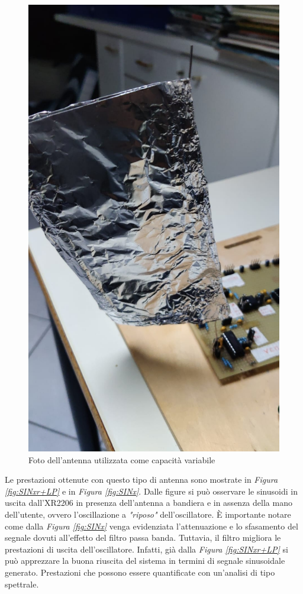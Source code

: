 \documentclass[titlepage]{report}
\begin{document}
	\begin{figure}[H]
		\centering
		\includegraphics[scale=0.25]{Immagini/Antenna.jpg}
		\caption{Foto dell'antenna utilizzata come capacità variabile}
		\label{fig:antenna}
	\end{figure}
	
	Le prestazioni ottenute con questo tipo di antenna sono mostrate in \textit{Figura \ref{fig:SINxr+LP}} e in \textit{Figura \ref{fig:SINx}}. Dalle figure si può osservare le sinusoidi in uscita dall'XR2206 in presenza dell'antenna a bandiera e in assenza della mano dell'utente, ovvero l'oscillazione a \textit{"riposo"} dell'oscillatore. È importante notare come dalla \textit{Figura \ref{fig:SINx}} venga evidenziata l'attenuazione e lo sfasamento del segnale dovuti all'effetto del filtro passa banda. Tuttavia, il filtro migliora le prestazioni di uscita dell'oscillatore. Infatti, già dalla \textit{Figura \ref{fig:SINxr+LP}} si può apprezzare la buona riuscita del sistema in termini di segnale sinusoidale generato. Prestazioni che possono essere quantificate con un'analisi di tipo spettrale.
\end{document}
